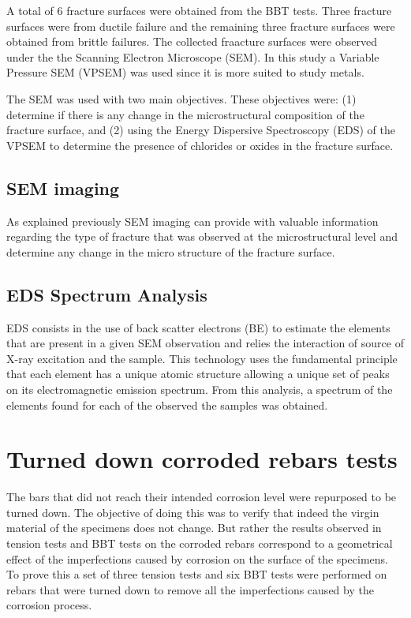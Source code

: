 A total of 6 fracture surfaces were obtained from the BBT tests. Three fracture surfaces were from ductile failure and the remaining three fracture surfaces were obtained from brittle failures. The collected fraacture surfaces were observed under the the Scanning Electron Microscope (SEM). In this study a Variable Pressure SEM (VPSEM) was used since it is more suited to study metals.

The SEM was used with two main objectives. These objectives were: (1) determine if there is any change in the microstructural composition of the fracture surface, and (2) using the Energy Dispersive Spectroscopy (EDS) of the VPSEM to determine the presence of chlorides or oxides in the fracture surface. 

\subsection{SEM imaging}
As explained previously SEM imaging can provide with valuable information regarding the type of fracture that was observed at the microstructural level and determine any change in the micro structure of the fracture surface.

\subsection{EDS Spectrum Analysis}

EDS consists in the use of back scatter electrons (BE) to estimate the elements that are present in a given SEM observation and relies the interaction of  source of X-ray excitation and the sample. This technology uses the fundamental principle that each element has a unique atomic structure allowing a unique set of peaks on its electromagnetic emission spectrum. From this analysis, a spectrum of the elements found for each of the observed the samples was obtained. 

\section{Turned down corroded rebars tests}

The bars that did not reach their intended corrosion level were repurposed to be turned down. The objective of doing this was to verify that indeed the virgin material of the specimens does not change. But rather the results observed in tension tests and BBT tests on the corroded rebars correspond to a geometrical effect of the imperfections caused by corrosion on the surface of the specimens. To prove this a set of three tension tests and six BBT tests were performed on rebars that were turned down to remove all the imperfections caused by the corrosion process.

